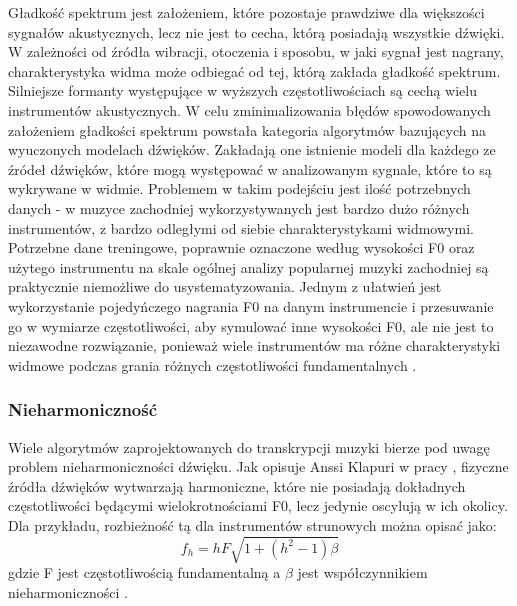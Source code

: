\documentclass[12pt,a4paper,twoside]{mwart}
\begin{document}
Gładkość spektrum jest założeniem, które pozostaje prawdziwe dla większości sygnałów akustycznych, lecz nie jest to cecha, którą posiadają wszystkie dźwięki. W zależności od źródła wibracji, otoczenia i sposobu, w jaki sygnał jest nagrany, charakterystyka widma może odbiegać od tej, którą zakłada gładkość spektrum. Silniejsze formanty występujące w wyższych częstotliwościach są cechą wielu instrumentów akustycznych. W celu zminimalizowania błędów spowodowanych założeniem gładkości spektrum powstała kategoria algorytmów bazujących na wyuczonych modelach dźwięków. Zakładają one istnienie modeli dla każdego ze źródeł dźwięków, które mogą występować w analizowanym sygnale, które to są wykrywane w widmie. Problemem w takim podejściu jest ilość potrzebnych danych - w muzyce zachodniej wykorzystywanych jest bardzo dużo różnych instrumentów, z bardzo odległymi od siebie charakterystykami widmowymi. Potrzebne dane treningowe, poprawnie oznaczone według wysokości F0 oraz użytego instrumentu na skale ogólnej analizy popularnej muzyki zachodniej są praktycznie niemożliwe do usystematyzowania. Jednym z ułatwień jest wykorzystanie pojedyńczego nagrania F0 na danym instrumencie i przesuwanie go w wymiarze częstotliwości, aby symulować inne wysokości F0, ale nie jest to niezawodne rozwiązanie, ponieważ wiele instrumentów ma różne charakterystyki widmowe podczas grania różnych częstotliwości fundamentalnych 
\cite[55-68]{Transcription:Quenneville:Thesis}.

\subsubsection{Nieharmoniczność} \label{sec:multif0:inh:model}
Wiele algorytmów zaprojektowanych do transkrypcji muzyki bierze pod uwagę problem nieharmoniczności dźwięku. Jak opisuje Anssi Klapuri w pracy 
\cite[806-808]{Transcription:Klapuri:MultipleFundamentalFrequencyEstimation},
fizyczne źródła dźwięków wytwarzają harmoniczne, które nie posiadają dokładnych częstotliwości będącymi wielokrotnościami F0, lecz jedynie oscylują w ich okolicy. Dla przykładu, rozbieżność tą dla instrumentów strunowych można opisać jako:
\begin{equation}\label{eq:inharmonicity:strings}
  f_h = hF \sqrt{1 + (h^2 - 1) \beta}
\end{equation}
gdzie F jest częstotliwością fundamentalną a $\beta$ jest współczynnikiem nieharmoniczności 
\cite[807]{Transcription:Klapuri:MultipleFundamentalFrequencyEstimation}.
\end{document}

